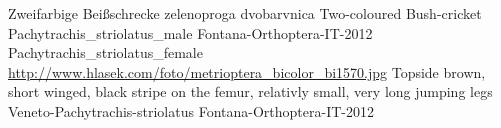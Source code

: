 {Zweifarbige Beißschrecke} %
{zelenoproga dvobarvnica} %
{Two-coloured Bush-cricket} %
{Pachytrachis_striolatus_male} %
{Fontana-Orthoptera-IT-2012}%
{Pachytrachis_striolatus_female} %
{\url{http://www.hlasek.com/foto/metrioptera_bicolor_bi1570.jpg}} %
{Topside brown, short winged, black stripe on the femur, relativly small, very long jumping legs} %
{} %
{Veneto-Pachytrachis-striolatus} %
{Fontana-Orthoptera-IT-2012}%
